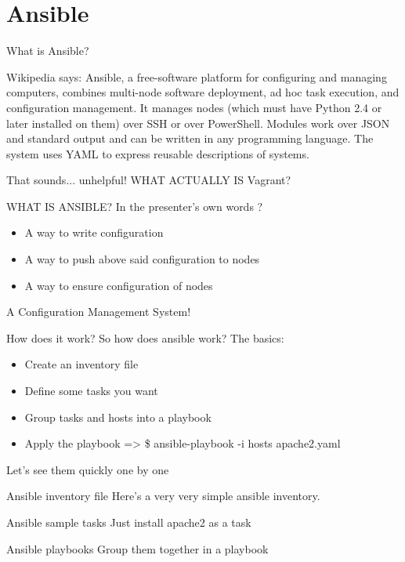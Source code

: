 \documentclass[aspectratio=1610]{beamer}
\begin{document}
\section{Ansible}
    \begin{frame}{What is Ansible?}
    \begin{block}{Wikipedia says:}
        Ansible, a free-software platform for configuring and managing computers, combines multi-node software deployment,
        ad hoc task execution, and configuration management. It manages nodes (which must have Python 2.4 or later installed on them)
        over SSH or over PowerShell. Modules work over JSON and standard output and can be written in any programming language.
        The system uses YAML to express reusable descriptions of systems.
    \end{block}
    \pause That sounds... unhelpful! WHAT ACTUALLY IS Vagrant?
    \end{frame}

    \begin{frame}{WHAT IS ANSIBLE?}
    In the presenter's own words ?
        \begin{itemize}
        \pause \item A way to write configuration
        \pause \item A way to push above said configuration to nodes
        \pause \item A way to ensure configuration of nodes
        \end{itemize}
    \begin{center}
        \pause A Configuration Management System!
    \end{center}
    \end{frame}

    \begin{frame}{How does it work?}
        So how does ansible work? The basics:
    \begin{itemize}
        \pause \item Create an inventory file
        \pause \item Define some tasks you want
        \pause \item Group tasks and hosts into a playbook
        \pause \item Apply the playbook =>  \$ ansible-playbook -i hosts apache2.yaml
    \end{itemize}
    \pause  Let's see them quickly one by one
    \end{frame}

    \begin{frame}{Ansible inventory file}
        Here's a very very simple ansible inventory.
        
    \end{frame}
    \begin{frame}{Ansible sample tasks}
        Just install apache2 as a task
        
    \end{frame}
    \begin{frame}{Ansible playbooks}
        Group them together in a playbook
        
    \end{frame}
\end{document}
